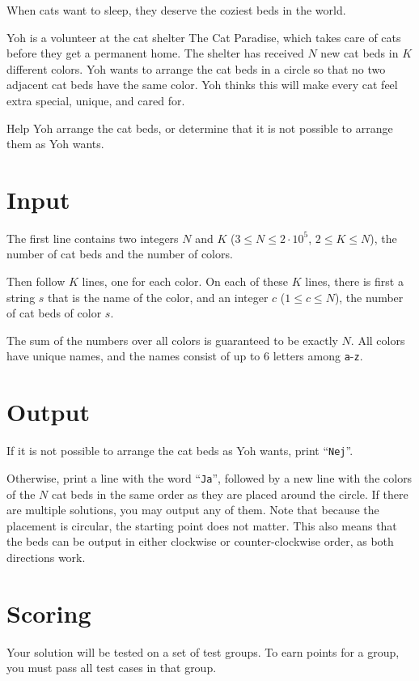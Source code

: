 
When cats want to sleep, they deserve the coziest beds in the world.

Yoh is a volunteer at the cat shelter The Cat Paradise, which takes care of cats before they get a permanent home.
The shelter has received $N$ new cat beds in $K$ different colors.
Yoh wants to arrange the cat beds in a circle so that no two adjacent cat beds have the same color.
Yoh thinks this will make every cat feel extra special, unique, and cared for.

Help Yoh arrange the cat beds, or determine that it is not possible to arrange them as Yoh wants.

\section*{Input}
The first line contains two integers $N$ and $K$ ($3 \le N \le 2 \cdot 10^5$, $2 \le K \le N$), the number of cat beds and the number of colors.

Then follow $K$ lines, one for each color.
On each of these $K$ lines, there is first a string $s$ that is the name of the color, and an integer $c$ ($1 \leq c \leq N$), the number of cat beds of color $s$.

The sum of the numbers over all colors is guaranteed to be exactly $N$.
All colors have unique names, and the names consist of up to 6 letters among \texttt{a}-\texttt{z}.

\section*{Output}
If it is not possible to arrange the cat beds as Yoh wants, print ``\texttt{Nej}''.

Otherwise, print a line with the word ``\texttt{Ja}'', followed by a new line with the colors of the $N$ cat beds in the same order as they are placed around the circle.
If there are multiple solutions, you may output any of them.
Note that because the placement is circular, the starting point does not matter.
This also means that the beds can be output in either clockwise or counter-clockwise order, as both directions work.

\section*{Scoring}
Your solution will be tested on a set of test groups.
To earn points for a group, you must pass all test cases in that group.

